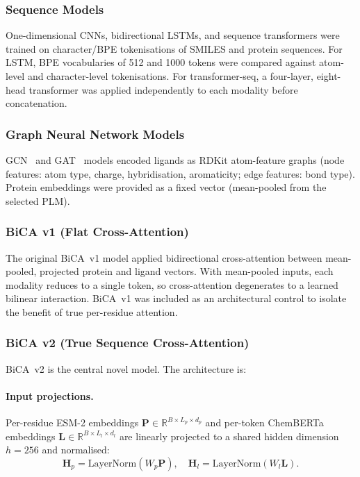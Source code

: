 \documentclass[11pt,twocolumn]{article}
\begin{document}
\subsubsection{Sequence Models}
One-dimensional CNNs, bidirectional LSTMs, and sequence transformers were
trained on character/BPE tokenisations of SMILES and protein sequences.
For LSTM, BPE vocabularies of 512 and 1000 tokens were compared against
atom-level and character-level tokenisations.  For transformer-seq, a
four-layer, eight-head transformer was applied independently to each modality
before concatenation.

\subsubsection{Graph Neural Network Models}
GCN~\cite{kipf2017gcn} and GAT~\cite{velickovic2018gat} models encoded
ligands as RDKit atom-feature graphs (node features: atom type, charge,
hybridisation, aromaticity; edge features: bond type).  Protein embeddings
were provided as a fixed vector (mean-pooled from the selected PLM).

\subsubsection{BiCA v1 (Flat Cross-Attention)}
The original BiCA~v1 model applied bidirectional cross-attention between
mean-pooled, projected protein and ligand vectors.  With mean-pooled inputs,
each modality reduces to a single token, so cross-attention degenerates to
a learned bilinear interaction.  BiCA~v1 was included as an architectural
control to isolate the benefit of true per-residue attention.

\subsubsection{BiCA v2 (True Sequence Cross-Attention)}
\label{sec:bica_v2}

BiCA~v2 is the central novel model.  The architecture is:

\paragraph{Input projections.}
Per-residue ESM-2 embeddings $\mathbf{P} \in \mathbb{R}^{B \times L_p \times d_p}$ and per-token ChemBERTa embeddings $\mathbf{L} \in \mathbb{R}^{B \times L_l \times d_l}$ are linearly projected to a shared hidden dimension $h=256$ and normalised:
\[
  \mathbf{H}_p = \text{LayerNorm}(W_p \mathbf{P}), \quad
  \mathbf{H}_l = \text{LayerNorm}(W_l \mathbf{L}).
\]
\end{document}
